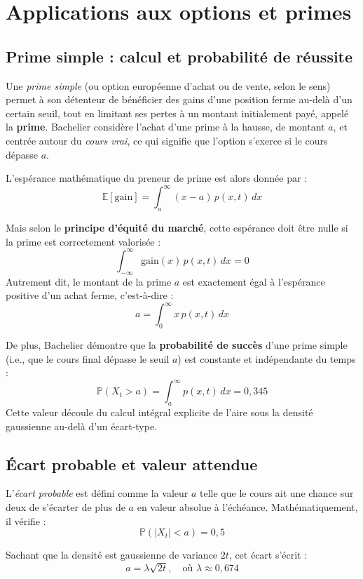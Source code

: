 \documentclass[12pt,a4paper]{article}
\begin{document}
\section{Applications aux options et primes}

\subsection{Prime simple : calcul et probabilité de réussite}

Une \textit{prime simple} (ou option européenne d'achat ou de vente, selon le sens) permet à son détenteur de bénéficier des gains d'une position ferme au-delà d’un certain seuil, tout en limitant ses pertes à un montant initialement payé, appelé la \textbf{prime}. Bachelier considère l'achat d'une prime à la hausse, de montant $a$, et centrée autour du \textit{cours vrai}, ce qui signifie que l’option s’exerce si le cours dépasse $a$.

L’espérance mathématique du preneur de prime est alors donnée par :
\[
\mathbb{E}[\text{gain}] = \int_a^{\infty} (x - a)\, p(x,t)\, dx
\]

Mais selon le \textbf{principe d'équité du marché}, cette espérance doit être nulle si la prime est correctement valorisée :
\[
\int_{-\infty}^{\infty} \text{gain}(x)\, p(x,t)\, dx = 0
\]
Autrement dit, le montant de la prime $a$ est exactement égal à l’espérance positive d’un achat ferme, c’est-à-dire :
\[
a = \int_0^{\infty} x\, p(x,t)\, dx
\]

De plus, Bachelier démontre que la \textbf{probabilité de succès} d’une prime simple (i.e., que le cours final dépasse le seuil $a$) est constante et indépendante du temps :
\[
\mathbb{P}(X_t > a) = \int_a^{\infty} p(x,t)\, dx = 0{,}345
\]
Cette valeur découle du calcul intégral explicite de l'aire sous la densité gaussienne au-delà d’un écart-type.

\subsection{Écart probable et valeur attendue}

L’\textit{écart probable} est défini comme la valeur $a$ telle que le cours ait une chance sur deux de s’écarter de plus de $a$ en valeur absolue à l’échéance. Mathématiquement, il vérifie :
\[
\mathbb{P}(|X_t| < a) = 0{,}5
\]

Sachant que la densité est gaussienne de variance $2t$, cet écart s’écrit :
\[
a = \lambda \sqrt{2t}, \quad \text{où } \lambda \approx 0{,}674
\]
\end{document}
